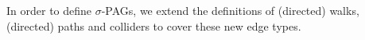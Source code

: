 In order to define $\sigma$-PAGs, we extend the definitions of (directed) walks, (directed) paths and colliders to cover these new edge types.
